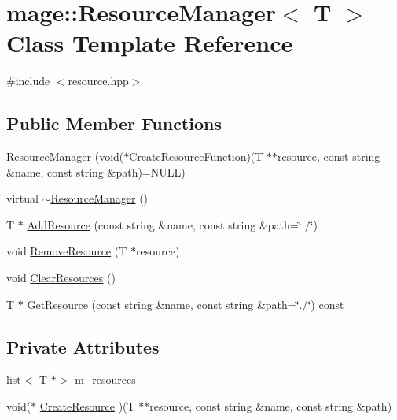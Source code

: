 \hypertarget{classmage_1_1_resource_manager}{}\section{mage\+:\+:Resource\+Manager$<$ T $>$ Class Template Reference}
\label{classmage_1_1_resource_manager}


{\ttfamily \#include $<$resource.\+hpp$>$}

\subsection*{Public Member Functions}
\begin{DoxyCompactItemize}
\item 
\hyperlink{classmage_1_1_resource_manager_aad8d61f96551b9ddd59593ed52eac241}{Resource\+Manager} (void($\ast$Create\+Resource\+Function)(T $\ast$$\ast$resource, const string \&name, const string \&path)=N\+U\+LL)
\item 
virtual \hyperlink{classmage_1_1_resource_manager_af3b6bf56e57bd3df0eb569510dd1483b}{$\sim$\+Resource\+Manager} ()
\item 
T $\ast$ \hyperlink{classmage_1_1_resource_manager_a358d8bcb9a0812cc69ff1e8cd8234988}{Add\+Resource} (const string \&name, const string \&path=\char`\"{}./\char`\"{})
\item 
void \hyperlink{classmage_1_1_resource_manager_ab10959337c87b6454209b5116478cc21}{Remove\+Resource} (T $\ast$resource)
\item 
void \hyperlink{classmage_1_1_resource_manager_a875ea647ed1d475ca2d3f39dc492215b}{Clear\+Resources} ()
\item 
T $\ast$ \hyperlink{classmage_1_1_resource_manager_a448a25bbe7ff37a88d1b19d50744d7ee}{Get\+Resource} (const string \&name, const string \&path=\char`\"{}./\char`\"{}) const
\end{DoxyCompactItemize}
\subsection*{Private Attributes}
\begin{DoxyCompactItemize}
\item 
list$<$ T $\ast$$>$ \hyperlink{classmage_1_1_resource_manager_ab058f7127d317bfe78b9f391a4351315}{m\+\_\+resources}
\item 
void($\ast$ \hyperlink{classmage_1_1_resource_manager_a1175cdd82a5407dd099b53a432ca9a95}{Create\+Resource} )(T $\ast$$\ast$resource, const string \&name, const string \&path)
\end{DoxyCompactItemize}


